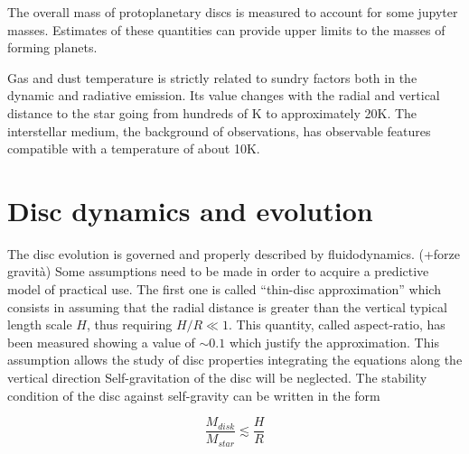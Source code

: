 \documentclass[a4paper,10pt]{report}
\begin{document}
The overall mass of protoplanetary discs is measured to account for some jupyter masses. Estimates of these quantities can provide upper limits
to the masses of forming planets.

Gas and dust temperature is strictly related to sundry factors both in the dynamic and radiative emission.
Its value changes with the radial and vertical distance to the star going from hundreds of K to approximately 20K.
The interstellar medium, the background of observations, has observable features compatible with a temperature of about 10K.


\section{Disc dynamics and evolution}

\begin{comment}
Here I am going to explain how the dynamic of gas and dust is modelled.

I am going to provide the equations describing the vertical structure, explain
the meaning of the aspect ratio and the viscous forces at play.

I will also explain the model describing the interaction
between the gas and solid components (Epstein force, stokes number).

Finally, I am going to cite other forces and effects which play a role in disc dynamics,
such as magnetorotational instability, turbulence, winds, photoevaporation, ...
\end{comment}

The disc evolution is governed and properly described by fluidodynamics. (+forze gravità)
Some assumptions need to be made in order to acquire a predictive model of practical use.
The first one is called ``thin-disc approximation'' which consists in assuming that the radial distance is greater than 
the vertical typical length scale $H$, thus requiring $H/R \ll 1$. This quantity, called aspect-ratio, has been measured 
showing a value of $\sim 0.1$ which justify the approximation. This assumption allows the study of disc properties integrating
the equations along the vertical direction
Self-gravitation of the disc will be neglected. The stability condition of the disc against self-gravity can be written in the form

\begin{equation}
    \frac{M_{disk}}{M_{star}} \lesssim  \frac{H}{R}
\end{equation}
\end{document}
